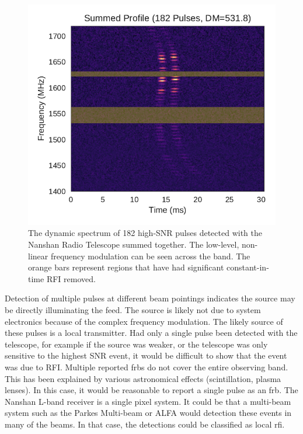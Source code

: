 \documentclass[a4paper,fleqn,usenatbib]{mnras}
\begin{document}
\begin{figure}
    \includegraphics[width=1.0\linewidth]{figures/XAO_summed_dynamic.pdf}
    \caption{The dynamic spectrum of 182 high-SNR pulses detected with the
    Nanshan Radio Telescope summed together.  The low-level, non-linear
    frequency modulation can be seen across the band. The orange bars represent
    regions that have had significant constant-in-time RFI removed.
    }
    \label{fig:xao_summed}
\end{figure}

Detection of multiple pulses at different beam pointings indicates the source
may be directly illuminating the feed. The source is likely not due to system
electronics because of the complex frequency modulation. The likely source of
these pulses is a local transmitter. Had only a single pulse been detected with
the telescope, for example if the source was weaker, or the telescope was only
sensitive to the highest SNR event, it would be difficult to show that the event
was due to RFI. Multiple reported \glspl{frb} do not cover the entire observing
band. This has been explained by various astronomical effects (scintillation,
plasma lenses). In this case, it would be reasonable to report a single pulse as
an \gls{frb}. The Nanshan L-band receiver is a single pixel system. It could be
that a multi-beam system such as the Parkes Multi-beam or ALFA would detection
these events in many of the beams. In that case, the detections could be
classified as local \gls{rfi}.
\end{document}
